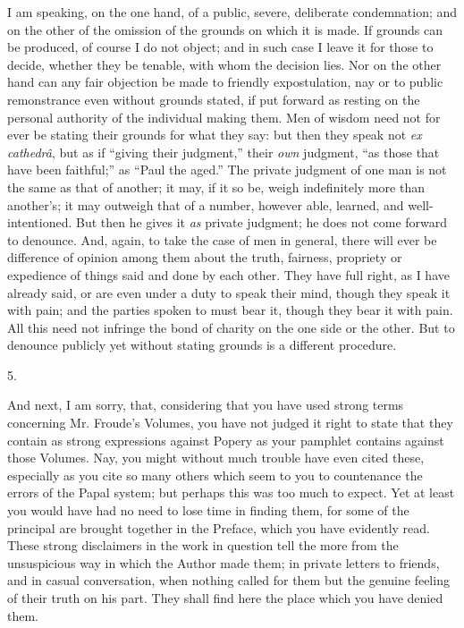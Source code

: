 I am speaking, on the one hand, of a public,
severe, deliberate condemnation; and on the other of the omission of
the grounds on which it is made. If grounds can be produced, of course
I do not object; and in such case I leave it for those to decide,
whether they be tenable, with whom the decision lies. Nor on the other
hand can any fair objection be made to friendly expostulation, nay or
to public remonstrance even without grounds stated, if put forward as
resting on the personal authority of the individual making them. Men
of wisdom need not for ever be stating their grounds for what they
say: but then they speak not \emph{ex cathedrâ}, but as if ``giving
their judgment,'' their \emph{own} judgment, ``as those that have
been faithful;'' as ``Paul the aged.'' The private judgment of one
man is not the same as that of another; it may, if it so be, weigh
indefinitely more than another's; it may outweigh that of a number,
however able, learned, and well-intentioned. But then he gives it \emph{as}
private judgment; he does not come forward to denounce. And, again, to
take the case of men in general, there will ever be difference of
opinion among them about the truth, fairness, propriety or expedience
of things said and done by each other. They have full right, as I have
already said, or are even under a duty to speak their mind,
though they speak it with pain; and the parties spoken to must bear
it, though they bear it with pain. All this need not infringe the bond
of charity on the one side or the other. But to denounce publicly yet
without stating grounds is a different procedure.

5.

And next, I am sorry, that, considering that you
have used strong terms concerning Mr. Froude's Volumes, you have not
judged it right to state that they contain as strong expressions
against Popery as your pamphlet contains against those Volumes. Nay,
you might without much trouble have even cited these, especially as
you cite so many others which seem to you to countenance the errors of
the Papal system; but perhaps this was too much to expect. Yet at
least you would have had no need to lose time in finding them, for
some of the principal are brought together in the Preface, which you
have evidently read. These strong disclaimers in the work in question
tell the more from the unsuspicious way in which the Author made them;
in private letters to friends, and in casual conversation, when
nothing called for them but the genuine feeling of their truth on his
part. They shall find here the place which you have denied them.

